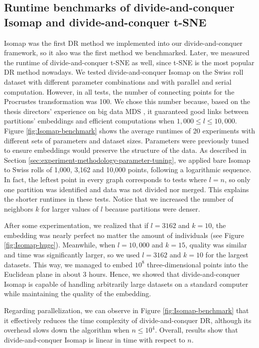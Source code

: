 \subsection{Runtime benchmarks of divide-and-conquer Isomap and divide-and-conquer t-SNE}
\label{sec:initial-runtime-benchmarks}

Isomap was the first DR method we implemented into our divide-and-conquer framework, so it also was the first method we benchmarked. Later, we measured the runtime of divide-and-conquer t-SNE as well, since t-SNE is the most popular DR method nowadays. We tested divide-and-conquer Isomap on the Swiss roll dataset with different parameter combinations and with parallel and serial computation. However, in all tests, the number of connecting points for the Procrustes transformation was 100. We chose this number because, based on the thesis directors' experience on big data MDS \citep{Delicado2024}, it guaranteed good links between partitions' embeddings and efficient computations when $1,000 \leq l \leq 10,000$. Figure \ref{fig:Isomap-benchmark} shows the average runtimes of 20 experiments with different sets of parameters and dataset sizes. Parameters were previously tuned to ensure embeddings would preserve the structure of the data. As described in Section \ref{sec:experiment-methodology-parameter-tuning}, we applied bare Isomap to Swiss rolls of 1,000, 3,162 and 10,000 points, following a logarithmic sequence. In fact, the leftest point in every graph corresponds to tests where $l=n$, so only one partition was identified and data was not divided nor merged. This explains the shorter runtimes in these tests. Notice that we increased the number of neighbors $k$ for larger values of $l$ because partitions were denser.

After some experimentation, we realized that if $l=3162$ and $k=10$, the embedding was nearly perfect no matter the amount of individuals (see Figure \ref{fig:Isomap-huge}). Meanwhile, when $l=10,000$ and $k=15$, quality was similar and time was significantly larger, so we used $l=3162$ and $k=10$ for the largest datasets. This way, we managed to embed $10^8$ three-dimensional points into the Euclidean plane in about 3 hours. Hence, we showed that divide-and-conquer Isomap is capable of handling arbitrarily large datasets on a standard computer while maintaining the quality of the embedding.

Regarding parallelization, we can observe in Figure \ref{fig:Isomap-benchmark} that it effectively reduces the time complexity of divide-and-conquer DR, although its overhead slows down the algorithm when $n \leq 10^4$. Overall, results show that divide-and-conquer Isomap is linear in time with respect to $n$.

